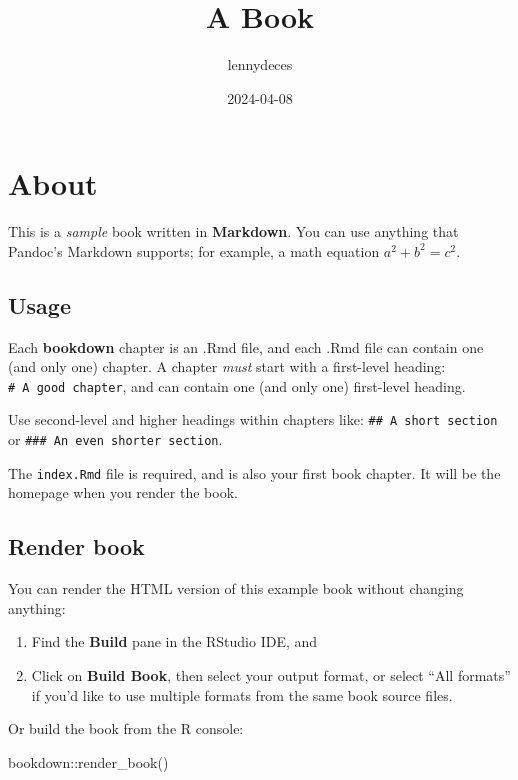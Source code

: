 \documentclass[
]{book}
\title{A Book}
\author{lennydeces}
\date{2024-04-08}
\newenvironment{Shaded}{\begin{snugshade}}{\end{snugshade}}
\newcommand{\FunctionTok}[1]{\textcolor[rgb]{0.00,0.00,0.00}{#1}}
\newcommand{\NormalTok}[1]{#1}
\newcommand{\SpecialCharTok}[1]{\textcolor[rgb]{0.00,0.00,0.00}{#1}}
\begin{document}
\maketitle

{
\setcounter{tocdepth}{1}
\tableofcontents
}
\hypertarget{about}{%
\chapter{About}\label{about}}

This is a \emph{sample} book written in \textbf{Markdown}. You can use anything that Pandoc's Markdown supports; for example, a math equation \(a^2 + b^2 = c^2\).

\hypertarget{usage}{%
\section{Usage}\label{usage}}

Each \textbf{bookdown} chapter is an .Rmd file, and each .Rmd file can contain one (and only one) chapter. A chapter \emph{must} start with a first-level heading: \texttt{\#\ A\ good\ chapter}, and can contain one (and only one) first-level heading.

Use second-level and higher headings within chapters like: \texttt{\#\#\ A\ short\ section} or \texttt{\#\#\#\ An\ even\ shorter\ section}.

The \texttt{index.Rmd} file is required, and is also your first book chapter. It will be the homepage when you render the book.

\hypertarget{render-book}{%
\section{Render book}\label{render-book}}

You can render the HTML version of this example book without changing anything:

\begin{enumerate}
\def\labelenumi{\arabic{enumi}.}
\item
  Find the \textbf{Build} pane in the RStudio IDE, and
\item
  Click on \textbf{Build Book}, then select your output format, or select ``All formats'' if you'd like to use multiple formats from the same book source files.
\end{enumerate}

Or build the book from the R console:

\begin{Shaded}
\begin{Highlighting}[]
\NormalTok{bookdown}\SpecialCharTok{::}\FunctionTok{render\_book}\NormalTok{()}
\end{Highlighting}
\end{Shaded}
\end{document}
